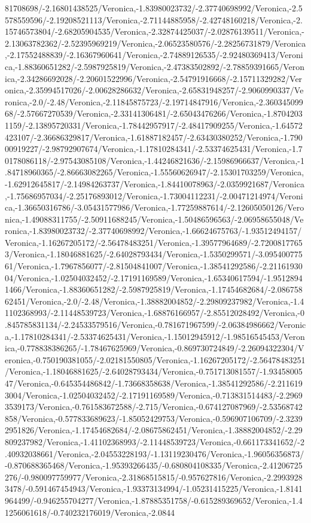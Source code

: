 {\begin{tikzternal}
81708698/-2.16801438525/Veronica,-1.83980023732/-2.37740698992/Veronica,-2.5578559596/-2.19208521113/Veronica,-2.71144885958/-2.42748160218/Veronica,-2.15746573804/-2.68205904535/Veronica,-2.32874425037/-2.02876139511/Veronica,-2.13063782362/-2.52395969219/Veronica,-2.06523580576/-2.28256731879/Veronica,-2.17552488839/-2.16367960641/Veronica,-2.74889126535/-2.92480369413/Veronica,-1.88360651282/-2.5987925819/Veronica,-2.47383502892/-2.78859391665/Veronica,-2.34286692028/-2.20601522996/Veronica,-2.54791916668/-2.15711329282/Veronica,-2.35994517026/-2.00628286632/Veronica,-2.65831948257/-2.9060990337/Veronica,-2.0/-2.48/Veronica,-2.11845875723/-2.19714847916/Veronica,-2.36034509968/-2.57667270539/Veronica,-2.33141306481/-2.65043476266/Veronica,-1.87042031159/-2.13895720331/Veronica,-1.78442957917/-2.48417909255/Veronica,-1.64572423107/-2.36686329817/Veronica,-1.61887182457/-2.63430380252/Veronica,-1.79000919227/-2.98792907674/Veronica,-1.17810284341/-2.53374625431/Veronica,-1.70178086118/-2.97543085108/Veronica,-1.44246821636/-2.15986966637/Veronica,-1.84718960365/-2.86663082265/Veronica,-1.55560626947/-2.15301703259/Veronica,-1.62912645817/-2.14984263737/Veronica,-1.84410078963/-2.0359921687/Veronica,-1.75686957034/-2.25176893012/Veronica,-1.73004112231/-2.00471214974/Veronica,-1.36650316786/-3.05431577986/Veronica,-1.77259887614/-2.12605050126/Veronica,-1.49088311755/-2.50911688245/Veronica,-1.50486596563/-2.06958655048/Veronica,-1.83980023732/-2.37740698992/Veronica,-1.66624675763/-1.93512494157/Veronica,-1.16267205172/-2.56478483251/Veronica,-1.39577964689/-2.72008177653/Veronica,-1.18046881625/-2.64028793434/Veronica,-1.5350299571/-3.09540077561/Veronica,-1.7967856077/-2.81504841007/Veronica,-1.38541292586/-2.2116193004/Veronica,-1.02504032452/-2.17191169589/Veronica,-1.65340617594/-1.95128941466/Veronica,-1.88360651282/-2.5987925819/Veronica,-1.17454682684/-2.08675862451/Veronica,-2.0/-2.48/Veronica,-1.38882004852/-2.29809237982/Veronica,-1.41102368993/-2.11448539723/Veronica,-1.68876166957/-2.85512028492/Veronica,-0.845785831134/-2.24533579516/Veronica,-0.781671967599/-2.06384986662/Veronica,-1.17810284341/-2.53374625431/Veronica,-1.15012945912/-1.98516545453/Veronica,-0.778838386265/-1.78467625969/Veronica,-0.869730724849/-2.26094322304/Veronica,-0.750190381055/-2.02181550805/Veronica,-1.16267205172/-2.56478483251/Veronica,-1.18046881625/-2.64028793434/Veronica,-0.751713081557/-1.9345800547/Veronica,-0.645354486842/-1.73668358638/Veronica,-1.38541292586/-2.2116193004/Veronica,-1.02504032452/-2.17191169589/Veronica,-0.713831514483/-2.29693539173/Veronica,-0.761583672588/-2.715/Veronica,-0.674127087969/-2.53568742858/Veronica,-0.577833689623/-1.85052429753/Veronica,-0.596907106709/-2.32392951826/Veronica,-1.17454682684/-2.08675862451/Veronica,-1.38882004852/-2.29809237982/Veronica,-1.41102368993/-2.11448539723/Veronica,-0.661173341652/-2.40932038661/Veronica,-2.04553228193/-1.13119230476/Veronica,-1.96056356873/-0.870688365468/Veronica,-1.95393266435/-0.680804108335/Veronica,-2.41206725276/-0.980097759977/Veronica,-2.31868515815/-0.957627816/Veronica,-2.29939283478/-0.591467454943/Veronica,-1.93373134994/-1.05231415225/Veronica,-1.8141964499/-0.946255704277/Veronica,-1.87885351758/-0.615289369652/Veronica,-1.41256061618/-0.740232176019/Veronica,-2.0844
\end{tikzternal}}
